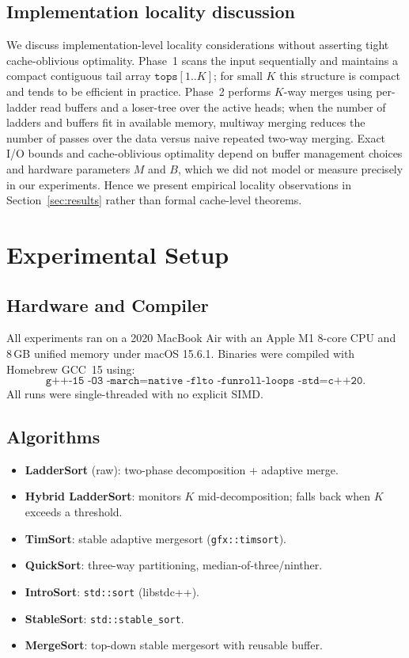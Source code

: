 \documentclass[12pt,a4paper]{article}
\theoremstyle{plain}
\theoremstyle{definition}
\newcommand{\tops}{\texttt{tops}}
\begin{document}
\subsection{Implementation locality discussion}
\label{sec:io}

We discuss implementation-level locality considerations without asserting
tight cache-oblivious optimality.  Phase~1 scans the input sequentially and
maintains a compact contiguous tail array $\tops[1..K]$; for small $K$ this
structure is compact and tends to be efficient in practice.  Phase~2
performs $K$-way merges using per-ladder read buffers and a loser-tree over
the active heads; when the number of ladders and buffers fit in available
memory, multiway merging reduces the number of passes over the data versus
naive repeated two-way merging.  Exact I/O bounds and cache-oblivious
optimality depend on buffer management choices and hardware parameters $M$
and $B$, which we did not model or measure precisely in our experiments.
Hence we present empirical locality observations in Section~\ref{sec:results}
rather than formal cache-level theorems.

\section{Experimental Setup}
\label{sec:setup}

\subsection{Hardware and Compiler}

All experiments ran on a 2020 MacBook Air with an Apple M1 8-core CPU and
8\,GB unified memory under macOS 15.6.1.  Binaries were compiled with
Homebrew GCC~15 using:
\[
  \texttt{g++-15\ -O3\ -march=native\ -flto\ -funroll-loops\ -std=c++20}.
\]
All runs were single-threaded with no explicit SIMD.

\subsection{Algorithms}

\begin{itemize}
  \item \textbf{LadderSort} (raw): two-phase decomposition + adaptive merge.
  \item \textbf{Hybrid LadderSort}: monitors $K$ mid-decomposition; falls back
    when $K$ exceeds a threshold.
  \item \textbf{TimSort}: stable adaptive mergesort (\texttt{gfx::timsort}).
  \item \textbf{QuickSort}: three-way partitioning, median-of-three/ninther.
  \item \textbf{IntroSort}: \texttt{std::sort} (libstdc++).
  \item \textbf{StableSort}: \texttt{std::stable\_sort}.
  \item \textbf{MergeSort}: top-down stable mergesort with reusable buffer.
\end{itemize}
\end{document}
